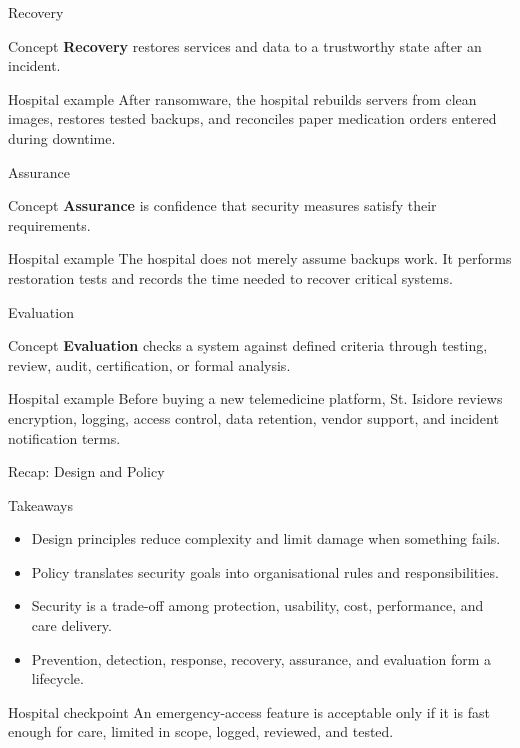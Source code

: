 \documentclass[presentation]{beamer}
\begin{document}
\begin{frame}[c]{Recovery}
\begin{block}{Concept}
\textbf{Recovery} restores services and data to a trustworthy state after an incident.
\end{block}

\begin{exampleblock}{Hospital example}
After ransomware, the hospital rebuilds servers from clean images, restores tested backups, and
reconciles paper medication orders entered during downtime.
\end{exampleblock}
\end{frame}

\begin{frame}[c]{Assurance}
\begin{block}{Concept}
\textbf{Assurance} is confidence that security measures satisfy their requirements.
\end{block}

\begin{exampleblock}{Hospital example}
The hospital does not merely assume backups work. It performs restoration tests and records the
time needed to recover critical systems.
\end{exampleblock}
\end{frame}

\begin{frame}[c]{Evaluation}
\begin{block}{Concept}
\textbf{Evaluation} checks a system against defined criteria through testing, review, audit,
certification, or formal analysis.
\end{block}

\begin{exampleblock}{Hospital example}
Before buying a new telemedicine platform, St. Isidore reviews encryption, logging, access
control, data retention, vendor support, and incident notification terms.
\end{exampleblock}
\end{frame}

\begin{frame}[c]{Recap: Design and Policy}
\begin{block}{Takeaways}
\begin{itemize}
    \item Design principles reduce complexity and limit damage when something fails.
    \item Policy translates security goals into organisational rules and responsibilities.
    \item Security is a trade-off among protection, usability, cost, performance, and care delivery.
    \item Prevention, detection, response, recovery, assurance, and evaluation form a lifecycle.
\end{itemize}
\end{block}

\begin{exampleblock}{Hospital checkpoint}
An emergency-access feature is acceptable only if it is fast enough for care, limited in scope,
logged, reviewed, and tested.
\end{exampleblock}
\end{frame}
\end{document}
